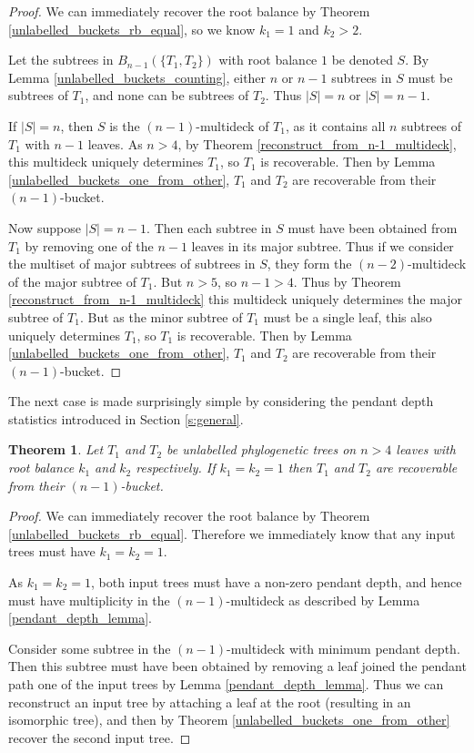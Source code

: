 \documentclass[12pt]{article}
\newtheorem{Theorem}{Theorem}[section]
\theoremstyle{definition}
\begin{document}
\begin{proof}
        We can immediately recover the root balance by Theorem \ref{unlabelled_buckets_rb_equal}, so we know $k_1=1$ and $k_2>2$.

        Let the subtrees in $B_{n-1}(\{T_1, T_2\})$ with root balance $1$ be denoted $S$. By Lemma \ref{unlabelled_buckets_counting}, either $n$ or $n-1$ subtrees in $S$ must be subtrees of $T_1$, and none can be subtrees of $T_2$. Thus $|S| = n$ or $|S| = n-1$.

        If $|S| = n$, then $S$ is the $(n-1)$-multideck of $T_1$, as it contains all $n$ subtrees of $T_1$ with $n-1$ leaves. As $n>4$, by Theorem \ref{reconstruct_from_n-1_multideck}, this multideck uniquely determines $T_1$, so $T_1$ is recoverable. Then by Lemma \ref{unlabelled_buckets_one_from_other}, $T_1$ and $T_2$ are recoverable from their $(n-1)$-bucket.

        Now suppose $|S| = n - 1$. Then each subtree in $S$ must have been obtained from $T_1$ by removing one of the $n-1$ leaves in its major subtree. Thus if we consider the multiset of major subtrees of subtrees in $S$, they form the $(n-2)$-multideck of the major subtree of $T_1$. But $n>5$, so $n-1 > 4$. Thus by Theorem \ref{reconstruct_from_n-1_multideck} this multideck uniquely determines the major subtree of $T_1$. But as the minor subtree of $T_1$ must be a single leaf, this also uniquely determines $T_1$, so $T_1$ is recoverable. Then by Lemma \ref{unlabelled_buckets_one_from_other}, $T_1$ and $T_2$ are recoverable from their $(n-1)$-bucket.
\end{proof}

The next case is made surprisingly simple by considering the pendant depth statistics introduced in Section \ref{s:general}.

\begin{Theorem}\label{unlabelled_buckets_theorem5}
    Let $T_1$ and $T_2$ be unlabelled phylogenetic trees on $n>4$ leaves with root balance $k_1$ and $k_2$ respectively. If $k_1 = k_2 = 1$ then $T_1$ and $T_2$ are recoverable from their $(n-1)$-bucket.
\end{Theorem}

\begin{proof}
    We can immediately recover the root balance by Theorem \ref{unlabelled_buckets_rb_equal}. Therefore we immediately know that any input trees must have $k_1=k_2=1$.

    As $k_1=k_2=1$, both input trees must have a non-zero pendant depth, and hence must have multiplicity in the $(n-1)$-multideck as described by Lemma \ref{pendant_depth_lemma}.

    Consider some subtree in the $(n-1)$-multideck with minimum pendant depth. Then this subtree must have been obtained by removing a leaf joined the pendant path one of the input trees by Lemma \ref{pendant_depth_lemma}. Thus we can reconstruct an input tree by attaching a leaf at the root (resulting in an isomorphic tree), and then by Theorem \ref{unlabelled_buckets_one_from_other} recover the second input tree.
    
\end{proof}
\end{document}
